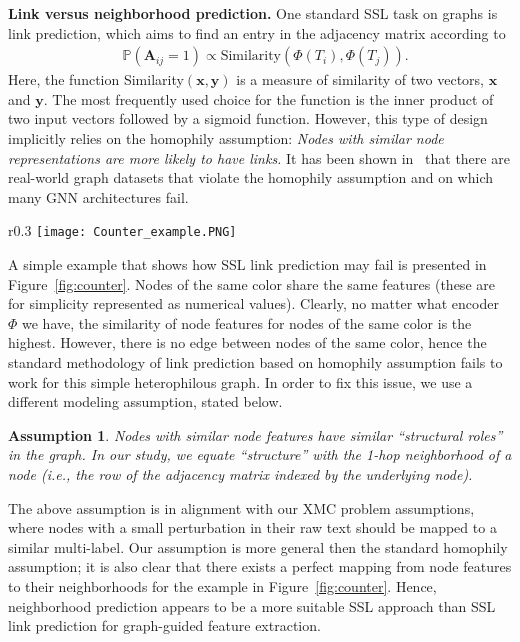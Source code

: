 \documentclass{article} %
\newtheorem{assumption}[theorem]{Assumption}
\begin{document}
\textbf{Link versus neighborhood prediction. }
One standard SSL task on graphs is link prediction, which aims to find an entry in the adjacency matrix according to
\begin{align}
	& \mathbb{P}\left(\mathbf{A}_{ij}=1\right) \propto \text{Similarity}\left(\Phi(T_i),\Phi(T_j)\right).
\end{align}
Here, the function Similarity$(\mathbf{x},\mathbf{y})$ is a measure of similarity of two vectors, $\mathbf{x}$ and $\mathbf{y}$. The most frequently used choice for the function is the inner product of two input vectors followed by a sigmoid function. However, this type of design implicitly relies on the homophily assumption: \emph{Nodes with similar node representations are more likely to have links.} It has been shown in~\cite{pei2020geom,chien2020adaptive,zhu2020beyond,lim2021new} that there are real-world graph datasets that violate the homophily assumption and on which many GNN architectures fail. 
\begin{wrapfigure}{r}{0.3\textwidth}
    \centering
    \vspace{-\intextsep}
    \texttt{[image: Counter\_example.PNG]}
    \vspace{-0.8cm}
  \caption{A counter-example for standard link prediction methodology.}
  \label{fig:counter}
  \vspace{-\intextsep}
\end{wrapfigure}
A simple example that shows how SSL link prediction may fail is presented in Figure~\ref{fig:counter}. Nodes of the same color share the same features (these are for simplicity represented as numerical values). Clearly, no matter what encoder $\Phi$ we have, the similarity of node features for nodes of the same color is the highest. However, there is no edge between nodes of the same color, hence the standard methodology of link prediction based on homophily assumption fails to work for this simple heterophilous graph. In order to fix this issue, we use a different modeling assumption, stated below.
\begin{assumption}\label{conj:1}
Nodes with similar node features have similar ``structural roles'' in the graph. In our study, we equate ``structure'' with the 1-hop neighborhood of a node (i.e., the row of the adjacency matrix indexed by the underlying node).
\end{assumption}
The above assumption is in alignment with our XMC problem assumptions, where nodes with a small perturbation in their raw text should be mapped to a similar multi-label. Our assumption is more general then the standard homophily assumption; it is also clear that there exists a perfect mapping from node features to their neighborhoods for the example in Figure~\ref{fig:counter}. Hence, neighborhood prediction appears to be a more suitable SSL approach than SSL link prediction for graph-guided feature extraction.
\end{document}
